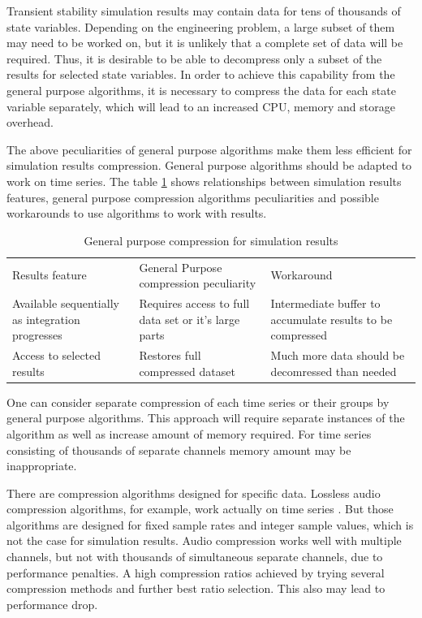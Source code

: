 \documentclass[lettersize,journal]{IEEEtran}
\begin{document}
Transient stability simulation results may contain data for tens of thousands of state variables.
Depending on the engineering problem, a large subset of them may need to be worked on, but it is unlikely that a complete set of data will be required.
Thus, it is desirable to be able to decompress only a subset of the results for selected state variables. 
In order to achieve this capability from the general purpose algorithms, it is necessary to compress the data for each 
state variable separately, which will lead to an increased CPU, memory and storage overhead.

The above peculiarities of general purpose algorithms make them less efficient for simulation 
results compression. General purpose algorithms should be adapted to work on time series. 
The table \ref{tab:gpcompr} shows relationships between simulation results features, general purpose
compression algorithms peculiarities and possible workarounds to use algorithms to work with
results.

\begin{table}[!h]
	\caption{General purpose compression for simulation results\label{tab:gpcompr}}
	\centering
	\begin{tabularx}{\columnwidth}{ 
			  >{\raggedright\arraybackslash}X 
			| >{\raggedright\arraybackslash}X 
			| >{\raggedright\arraybackslash}X }
		\hline
		Results feature & General Purpose compression peculiarity & Workaround\\
		\hlineB{3}	
		Available sequentially as integration progresses & 
		Requires access to full data set or it's large parts  &
		Intermediate buffer to accumulate results to be compressed\\
		\hline
		Access to selected results & 
		Restores full compressed dataset & 
		Much more data should be decomressed than needed\\
		\hline
	\end{tabularx}
\end{table}

One can consider separate compression of each time series or their groups by
general purpose algorithms. This approach will require separate instances
of the algorithm as well as increase amount of memory required. For time series
consisting of thousands of separate channels memory amount may be inappropriate.

There are compression algorithms designed for specific data. Lossless audio compression
algorithms, for example, work actually on time series \cite{lch03}. But those 
algorithms are designed for fixed sample rates and integer sample values, 
which is not the case for simulation results. Audio compression works well
with multiple channels, but not with thousands of simultaneous separate channels,
due to performance penalties. A high compression ratios achieved by trying
several compression methods and further best ratio selection. This also may
lead to performance drop.
\end{document}
